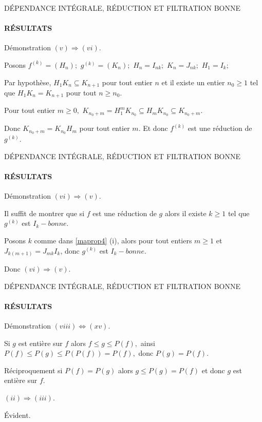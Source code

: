 \documentclass[11pt,a4paper]{beamer}
\begin{document}
\begin{frame}{DÉPENDANCE INTÉGRALE, RÉDUCTION ET FILTRATION BONNE}
	\framesubtitle{RÉSULTATS}
	\begin{block}{Démonstration}
		$(v)\Longrightarrow (vi).$
		
		Posons $f^{(k)}=(H_{n});$ $g^{(k)}=(K_{n});$ $H_{n}=I_{nk};$ $K_{n}=J_{nk};$ 
		$H_{1}=I_{k};$
		
		Par hypothèse, $H_{1}K_{n}\subseteq K_{n+1}$ pour tout entier $n$ et il
		existe un entier $n_{0}\geq 1$ tel que $H_{1}K_{n}=K_{n+1}$ pour tout $n\geq
		n_{0}.$
		
		Pour tout entier $m\geq 0,$ $K_{n_{0}+m}=H_{1}^{m}K_{n_{0}}\subseteq
		H_{m}K_{n_{0}}\subseteq K_{n_{0}+m}.$
		
		Donc $K_{n_{0}+m}=K_{n_{0}}H_{m}$ pour tout entier $m.$ Et donc $f^{(k)}$
		est une réduction de $g^{(k)}.$
		
	\end{block}
\end{frame}

\begin{frame}{DÉPENDANCE INTÉGRALE, RÉDUCTION ET FILTRATION BONNE}
	\framesubtitle{RÉSULTATS}
	\begin{block}{Démonstration}
		$(vi)\Longrightarrow (v).$
		
		Il suffit de montrer que si $f$ est une réduction de $g$ alors il existe 
		$k\geq 1$ tel que $g^{(k)}$ est $I_{k}-bonne.$
		
		Posons $k$ comme dans \ref{maprop4} (i), alors pour tout entiers $m\geq 1$ et  $J_{k(m+1)}=J_{mk}I_{k}$, donc $g^{(k)}$ est $I_{k}-bonne.$
		
		Donc $(vi)\Longrightarrow (v).$
	\end{block}
\end{frame}

\begin{frame}{DÉPENDANCE INTÉGRALE, RÉDUCTION ET FILTRATION BONNE}
	\framesubtitle{RÉSULTATS}
	\begin{block}{Démonstration}
		$(viii)\Longleftrightarrow (xv).$
		
		Si $g$ est entière sur $f$ alors $f\leq g\leq P(f),$ ainsi $P(f)\leq
		P(g)\leq P(P(f))=P(f),$ donc $P(g)=P(f).$
		
		Réciproquement si $P(f)=P(g)$ alors $g\leq P(g)=P(f)$ et donc $g$ est entière sur $f.$
		
		$(ii)\Longrightarrow (iii).$
		
		Évident.
	\end{block}
\end{frame}
\end{document}
